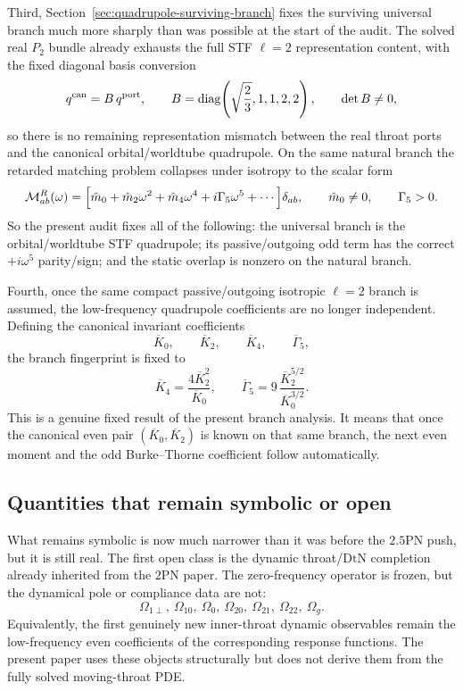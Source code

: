 \documentclass[11pt]{article}
\begin{document}
Third, Section~\ref{sec:quadrupole-surviving-branch} fixes the surviving
universal branch much more sharply than was possible at the start of the audit.
The solved real $P_2$ bundle already exhausts the full STF $\ell=2$
representation content, with the fixed diagonal basis conversion
\[
q^{\rm can}=B\,q^{\rm port},
\qquad
B=\mathrm{diag}\!\left(\sqrt{\frac23},1,1,2,2\right),
\qquad
\det B\neq 0,
\]
so there is no remaining representation mismatch between the real throat ports
and the canonical orbital/worldtube quadrupole.  On the same natural branch the
retarded matching problem collapses under isotropy to the scalar form
\[
\mathcal M_{ab}^R(\omega)
=
\Bigl[
\hat m_0+\hat m_2\omega^2+\hat m_4\omega^4+i\Gamma_5\omega^5+\cdots
\Bigr]\delta_{ab},
\qquad
\hat m_0\neq 0,
\qquad
\Gamma_5>0.
\]
So the present audit fixes all of the following: the universal branch is the
orbital/worldtube STF quadrupole; its passive/outgoing odd term has the correct
$+i\omega^5$ parity/sign; and the static overlap is nonzero on the natural
branch.

Fourth, once the same compact passive/outgoing isotropic $\ell=2$ branch is
assumed, the low-frequency quadrupole coefficients are no longer independent.
Defining the canonical invariant coefficients
\[
\overline K_0,\qquad \overline K_2,\qquad \overline K_4,
\qquad \overline\Gamma_5,
\]
the branch fingerprint is fixed to
\[
\overline K_4=\frac{4\overline K_2^2}{\overline K_0},
\qquad
\overline\Gamma_5
=
9\,\frac{\overline K_2^{5/2}}{\overline K_0^{3/2}}.
\]
This is a genuine fixed result of the present branch analysis.  It means that
once the canonical even pair $(\overline K_0,\overline K_2)$ is known on that
same branch, the next even moment and the odd Burke--Thorne coefficient follow
automatically.

\subsection{Quantities that remain symbolic or open}
\label{sec:fixed-vs-symbolic-open}

What remains symbolic is now much narrower than it was before the $2.5$PN push,
but it is still real.  The first open class is the dynamic throat/\(\mathrm{DtN}\)
completion already inherited from the $2$PN paper.  The zero-frequency operator
is frozen, but the dynamical pole or compliance data are not:
\[
\Omega_{1\perp},\ \Omega_{10},\ \Omega_0,
\ \Omega_{20},\ \Omega_{21},\ \Omega_{22},\ \Omega_g.
\]
Equivalently, the first genuinely new inner-throat dynamic observables remain the
low-frequency even coefficients of the corresponding response functions.  The
present paper uses these objects structurally but does not derive them from the
fully solved moving-throat PDE.
\end{document}
